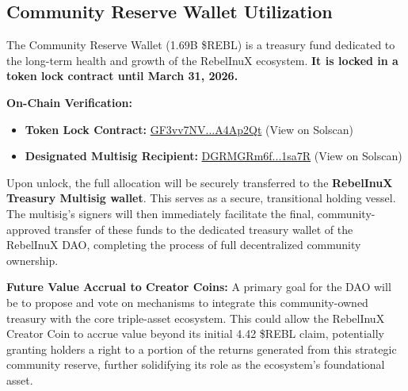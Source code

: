 \documentclass{article}
\begin{document}
\begin{tcolorbox}[colback=headerColor!10!white, colframe=headerColor, boxrule=2pt, width=\textwidth, arc=6mm, left=8mm, right=8mm, top=6mm, bottom=6mm]
\subsection[
  \texorpdfstring{\color{primaryColor}Community Reserve Wallet Utilization}{Community Reserve Wallet Utilization}
]{\color{primaryColor}Community Reserve Wallet Utilization}
\label{subsec:reserve}
The Community Reserve Wallet (1.69B \$REBL) is a treasury fund dedicated to the long-term health and growth of the RebelInuX ecosystem. \textbf{It is locked in a token lock  contract until March 31, 2026.}

\noindent\textbf{On-Chain Verification:}
\begin{itemize}
    \item \textbf{Token Lock Contract:} \href{https://solscan.io/account/GF3vv7NVEYGH4AmJexfzFKFerHRZ9mgmRiP1gA4Ap2Qt}{GF3vv7NV...A4Ap2Qt} (View on Solscan)
    \item \textbf{Designated Multisig Recipient:} \href{https://solscan.io/account/DGRMGRm6fWLs53ghWR7RFJ1JC8UvcKWQP9LtunQ1sa7R}{DGRMGRm6f...1sa7R} (View on Solscan)
\end{itemize}

Upon unlock, the full allocation will be securely transferred to the \textbf{RebelInuX Treasury Multisig wallet}. This serves as a secure, transitional holding vessel. The multisig's signers will then immediately facilitate the final, community-approved transfer of these funds to the dedicated treasury wallet of the RebelInuX DAO, completing the process of full decentralized community ownership.

\medskip %

\noindent\textbf{Future Value Accrual to Creator Coins:} A primary goal for the DAO will be to propose and vote on mechanisms to integrate this community-owned treasury with the core triple-asset ecosystem. This could allow the RebelInuX Creator Coin to accrue value beyond its initial 4.42 \$REBL claim, potentially granting holders a right to a portion of the returns generated from this strategic community reserve, further solidifying its role as the ecosystem's foundational asset.

\medskip


\end{tcolorbox}
\end{document}
